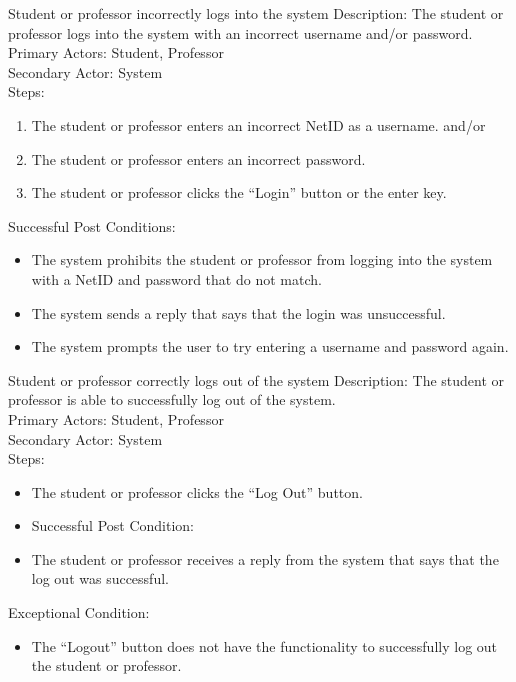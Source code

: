         \begin{section}{Student or professor incorrectly logs into the system}
    Description: The student or professor logs into the system with an incorrect username and/or password.\\
    Primary Actors: Student, Professor\\
    Secondary Actor: System\\
    Steps:
        \begin{enumerate}
            \item The student or professor enters an incorrect NetID as a username.
            	and/or
            \item The student or professor enters an incorrect password.
            \item The student or professor clicks the “Login” button or the enter key.\\
        \end{enumerate}
    Successful Post Conditions:
        \begin{itemize}
            \item The system prohibits the student or professor from logging into the system with a NetID and password that do not match.
            \item The system sends a reply that says that the login was unsuccessful.
            \item The system prompts the user to try entering a username and password again.
        \end{itemize}
    \end{section}



    \begin{section}{Student or professor correctly logs out of the system}
        Description: The student or professor is able to successfully log out of the system.\\
        Primary Actors: Student, Professor\\
        Secondary Actor: System\\
        Steps:
        \begin{itemize}
            \item The student or professor clicks the “Log Out” button.
            \item Successful Post Condition:
            \item The student or professor receives a reply from the system that says that the log out was successful.
        \end{itemize}
        Exceptional Condition:
        \begin{itemize}
            \item The “Logout” button does not have the functionality to successfully log out the student or professor.
        \end{itemize}
    \end{section}





